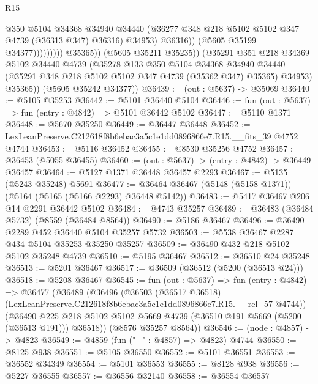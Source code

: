 \begin{lexlean}{R15}
\begin{coremodule}
{{{{{{{{{{{                                    @350
                                    @5104
                                    @34368
                                    @34940
                                    @34440
                                    (@36277 @348 @218 @5102 @5102 @347 @4739 (@36313 @347) @36316)
                                    @34953)
                                  @36316))
                              (@5605 @35199 @34377)))))))))
              @35365))
          (@5605 @35211 @35235))
        (@35291
          @351
          @218
          @34369
          @5102
          @34440
          @4739
          (@35278
            @133
            @350
            @5104
            @34368
            @34940
            @34440
            (@35291 @348 @218 @5102 @5102 @347 @4739 (@35362 @347) @35365)
            @34953)
          @35365))
      (@5605 @35242 @34377))
@36439 := (out : @5637) -> @35069
@36440 := @5105 @35253
@36442 := @5101 @36440 @5104
@36446 := fun (out : @5637) => fun (entry : @4842) => @5101 @36442 @5102
@36447 := @5110 @1371
@36448 := @5670 @35250
@36449 := @36447 @36448
@36452 := LexLeanPreserve.C212618f8b6ebac3a5c1e1dd0896866e7.R15.__fits_39 @4752 @4744
@36453 := @5116 @36452
@36455 := @8530 @35256 @4752
@36457 := @36453 (@5055 @36455)
@36460 := (out : @5637) -> (entry : @4842) -> @36449 @36457
@36464 := @5127 @1371 @36448 @36457 @2293
@36467 := @5135 (@5243 @35248) @5691
@36477 := @36464 @36467 (@5148 (@5158 @1371)) (@5164 (@5165 (@5166 @2293) @36448 @5142))
@36483 := @5417 @36467 @206 @14 @2291 @36442 @5102
@36484 := @4743 @35257
@36489 := @36483 (@36484 @5732) (@8559 (@36484 @8564))
@36490 := @5186 @36467
@36496 := @36490 @2289 @452 @36440 @5104 @35257 @5732
@36503 := @5538 @36467 @2287 @434 @5104 @35253 @35250 @35257
@36509 := @36490 @432 @218 @5102 @5102 @35248 @4739
@36510 := @5195 @36467
@36512 := @36510 @24 @35248
@36513 := @5201 @36467
@36517 := @36509 (@36512 (@5200 (@36513 @24)))
@36518 := @5208 @36467
@36545 := fun (out : @5637) =>
  fun (entry : @4842) =>
  @36477
    (@36489
      (@36496
        (@36503
          (@36517 @36518)
          (LexLeanPreserve.C212618f8b6ebac3a5c1e1dd0896866e7.R15.__rel_57 @4744))
        (@36490 @225 @218 @5102 @5102 @5669 @4739 (@36510 @191 @5669 (@5200 (@36513 @191))) @36518))
      (@8576 @35257 @8564))
@36546 := (node : @4857) -> @4823
@36549 := @4859 (fun ("_" : @4857) => @4823) @4744
@36550 := @8125 @938
@36551 := @5105 @36550
@36552 := @5101 @36551
@36553 := @36552 @34349
@36554 := @5101 @36553
@36555 := @8128 @938
@36556 := @5227 @36555
@36557 := @36556 @32140
@36558 := @36554 @36557
}}}}}}}}}}}
\end{coremodule}
\end{lexlean}
